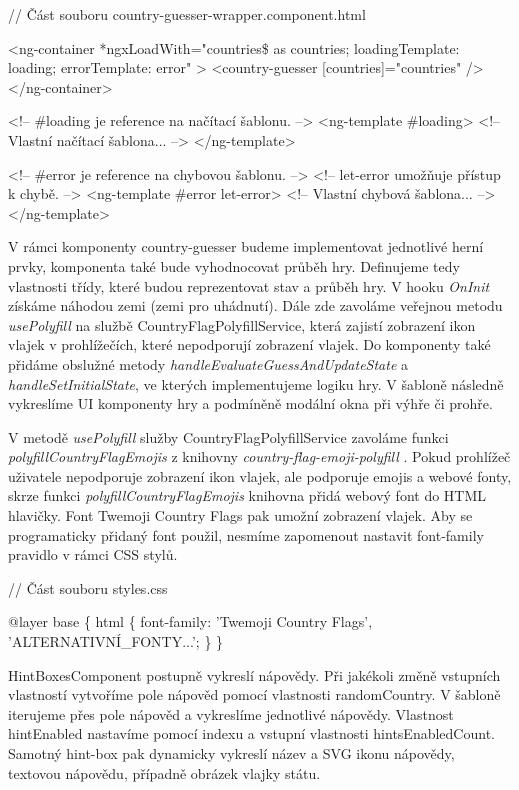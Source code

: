 \begin{prog}
// Část souboru country-guesser-wrapper.component.html

<ng-container
  *ngxLoadWith="countries\$ as countries; 
  loadingTemplate: loading; errorTemplate: error"
>
  <country-guesser [countries]="countries" />
</ng-container>

<!-- \#loading je reference na načítací šablonu. -->
<ng-template \#loading>
  <!-- Vlastní načítací šablona... -->
</ng-template>

<!-- \#error je reference na chybovou šablonu. -->
<!-- let-error umožňuje přístup k chybě. -->
<ng-template \#error let-error>
  <!-- Vlastní chybová šablona... -->
</ng-template>
\end{prog}

V rámci komponenty country-guesser budeme implementovat jednotlivé herní prvky, komponenta také bude vyhodnocovat průběh hry. 
Definujeme tedy vlastnosti třídy, které budou reprezentovat stav a průběh hry. V hooku \emph{OnInit} získáme náhodou zemi (zemi pro uhádnutí). 
Dále zde zavoláme veřejnou metodu \emph{usePolyfill} na službě CountryFlagPolyfillService, která zajistí zobrazení ikon vlajek v prohlížečích, které nepodporují zobrazení vlajek.
Do komponenty také přidáme obslužné metody \emph{handleEvaluateGuessAndUpdateState} a \emph{handleSetInitialState}, ve kterých implementujeme logiku hry. 
V šabloně následně vykreslíme UI komponenty hry a podmíněně modální okna při výhře či prohře.

V metodě \emph{usePolyfill} služby CountryFlagPolyfillService zavoláme funkci \emph{polyfillCountryFlagEmojis} z knihovny \emph{country-flag-emoji-polyfill} \cite{countryflagemojipolyfill}. 
Pokud prohlížeč uživatele nepodporuje zobrazení ikon vlajek, ale podporuje emojis a webové fonty, skrze funkci \emph{polyfillCountryFlagEmojis} knihovna přidá webový font do HTML hlavičky. 
Font Twemoji Country Flags pak umožní zobrazení vlajek. Aby se programaticky přidaný font použil, nesmíme zapomenout nastavit font-family pravidlo v rámci CSS stylů.

\begin{prog}
// Část souboru styles.css

@layer base \{
  html \{
    font-family: 'Twemoji Country Flags', 'ALTERNATIVNÍ_FONTY...';
  \}
\}
\end{prog}

HintBoxesComponent postupně vykreslí nápovědy. Při jakékoli změně vstupních vlastností vytvoříme pole nápověd pomocí vlastnosti randomCountry. 
V šabloně iterujeme přes pole nápověd a vykreslíme jednotlivé nápovědy. Vlastnost hintEnabled nastavíme pomocí indexu a vstupní vlastnosti hintsEnabledCount. 
Samotný hint-box pak dynamicky vykreslí název a SVG ikonu nápovědy, textovou nápovědu, případně obrázek vlajky státu.

